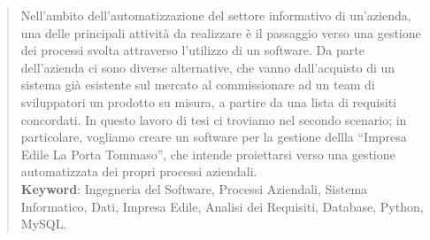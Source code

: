 \begin{abstract}

Nell’ambito dell’automatizzazione del settore informativo di un’azienda, una delle principali attività da realizzare è il passaggio verso una gestione dei processi svolta attraverso l’utilizzo di un software. Da parte dell’azienda ci sono diverse alternative, che vanno dall’acquisto di un sistema già esistente sul mercato al commissionare ad un team di sviluppatori un prodotto su misura, a partire da una lista di requisiti concordati. In questo lavoro di tesi ci troviamo nel secondo scenario; in particolare, vogliamo creare un software per la gestione dellla “Impresa Edile La Porta Tommaso”, che intende proiettarsi verso una gestione automatizzata dei propri processi aziendali.
\\[1cm]
\textbf{Keyword}: Ingegneria del Software, Processi Aziendali, Sistema Informatico, Dati, Impresa Edile, Analisi dei Requisiti, Database, Python, MySQL.
\end{abstract} 

